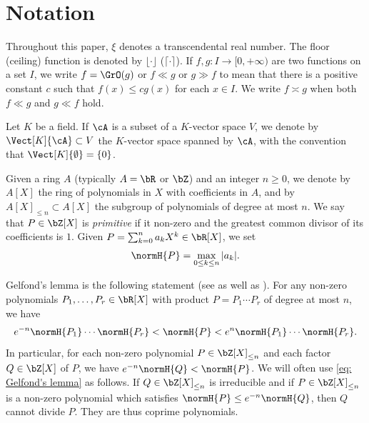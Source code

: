 \section{Notation}
\label{section: notation}
Throughout this paper, $\xi$ denotes a transcendental real number. The floor (\resp ceiling) function is denoted by $\lfloor \cdot \rfloor$ (\resp $\lceil \cdot \rceil$). If $f, g : I \to [0, +\infty)$ are two functions on a set $I$, we write $f = \GrO(g)$ or $f \ll g$ or $g \gg f$ to mean that there is a positive constant $c$ such that $f (x) \leq cg(x)$ for each $x\in I$. We write $f \asymp g$ when both $f \ll g$ and $g \ll f$ hold.

Let $K$ be a field. If $\cA$ is a subset of a $K$-vector space $V$, we denote by $\Vect[K]{\cA} \subset V$ the $K$-vector space spanned by $\cA$, with the convention that $\Vect[K]{\emptyset} = \{0\}$.

Given a ring $A$ (typically $A=\bR$ or $\bZ$) and an integer $n\geq 0$, we denote by $A[X]$ the ring of polynomials in $X$ with coefficients in $A$, and by $A[X]_{\leq n} \subset A[X]$ the subgroup of polynomials of degree at most $n$. We say that $P\in\bZ[X]$ is \emph{primitive} if it non-zero and the greatest common divisor of its coefficients is $1$. Given $P=\sum_{k=0}^{n} a_kX^k \in \bR[X]$, we set
\begin{equation*}
\normH{P} = \max_{0\leq k \leq n} |a_k|.
\end{equation*}

Gelfond's lemma is the following statement (see \eg \cite[Lem.\,A.3]{bugeaud2004approximation} as well as \cite{brownawell1974sequences}). For any non-zero polynomials $P_1,\dots,P_r\in\bR[X]$ with product $P = P_1\cdots P_r$ of degree at most $n$, we have
\begin{equation}
\label{eq: Gelfond's lemma}
e^{-n} \normH{P_1}\cdots \normH{P_r} < \normH{P} < e^{n} \normH{P_1}\cdots \normH{P_r}.
\end{equation}
In particular, for each non-zero polynomial $P \in \bZ[X]_{\leq n}$ and each factor $Q\in\bZ[X]$ of $P$, we have $e^{-n}\normH{Q} < \normH{P}$. We will often use \eqref{eq: Gelfond's lemma} as follows. If $Q\in\bZ[X]_{\leq n}$ is irreducible and if $P\in\bZ[X]_{\leq n}$ is a non-zero polynomial which satisfies $\normH{P} \leq e^{-n}\normH{Q}$, then $Q$ cannot divide $P$. They are thus coprime polynomials.

